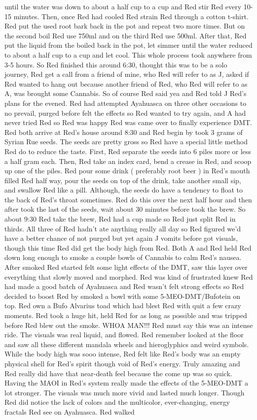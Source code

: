 \documentclass[12pt]{book}
\begin{document}
until the water was down to about a half cup to a cup and Red stir Red every 10-15 minutes. Then, once Red had cooled Red strain Red through a cotton t-shirt. Red put the used root bark back in the pot and repeat two more times. But on the second boil Red use 750ml and on the third Red use 500ml. After that, Red put the liquid from the boiled back in the pot, let simmer until the water reduced to about a half cup to a cup and let cool. This whole process took anywhere from 3-5 hours. So Red finished this around 6:30, thought this was to be a solo journey, Red get a call from a friend of mine, who Red will refer to as J, asked if Red wanted to hang out because another friend of Red, who Red will refer to as A, was brought some Cannabis. So of course Red said yea and Red told J Red's plans for the evened. Red had attempted Ayahuasca on three other occasions to no prevail, purged before felt the effects so Red wanted to try again, and A had never tried Red so Red was happy Red was came over to finally experience DMT. Red both arrive at Red's house around 8:30 and Red begin by took 3 grams of Syrian Rue seeds. The seeds are pretty gross so Red have a special little method Red do to reduce the taste. First, Red separate the seeds into 6 piles more or less a half gram each. Then, Red take an index card, bend a crease in Red, and scoop up one of the piles. Red pour some drink ( preferably root beer ) in Red's mouth filled Red half way, pour the seeds on top of the drink, take another small sip, and swallow Red like a pill. Although, the seeds do have a tendency to float to the back of Red's throat sometimes. Red do this over the next half hour and then after took the last of the seeds, wait about 30 minutes before took the brew. So about 9:30 Red take the brew, Red had a cup made so Red just split Red in thirds. All three of Red hadn't ate anything really all day so Red figured we'd have a better chance of not purged but yet again J vomits before got visuals, though this time Red did get the body high from Red. Both A and Red held Red down long enough to smoke a couple bowls of Cannabis to calm Red's nausea. After smoked Red started felt some light effects of the DMT, saw this layer over everything that slowly moved and morphed. Red was kind of frustrated knew Red had made a good batch of Ayahuasca and Red wasn't felt strong effects so Red decided to boost Red by smoked a bowl with some 5-MEO-DMT/Bufotein on top. Red own a Bufo Alvarius toad which had blest Red with quit a few crazy moments. Red took a huge hit, held Red for as long as possible and was tripped before Red blew out the smoke. WHOA MAN!!! Red must say this was an intense ride. The visuals was real liquid, and flowed. Red remember looked at the floor and saw all these different mandala wheels and hieroglyphics and weird symbols. While the body high was sooo intense, Red felt like Red's body was an empty physical shell for Red's spirit though void of Red's energy. Truly amazing and Red really did have that near-death feel because the come up was so quick. Having the MAOI in Red's system really made the effects of the 5-MEO-DMT a lot stronger. The visuals was much more vivid and lasted much longer. Though Red did notice the lack of colors and the multicolor, ever-changing, energy fractals Red see on Ayahuasca. Red walked 
\end{document}
